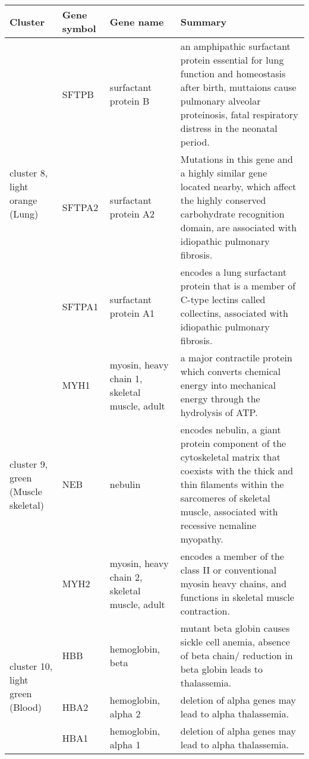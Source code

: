 \newpage
\begin{table}
\begin{center}
\begin{tabular}{|p{0.7in} |p{0.5in}|p{1.4in}|p{3.6in}|}
\hline
Cluster & Gene symbol & Gene name  & Summary \\
\hline
\multirow{3}{4em}{\small{cluster 8, light orange (Lung)}} & \small{SFTPB} & \footnotesize{surfactant protein B} & \scriptsize {an amphipathic surfactant protein essential for lung function and homeostasis after birth, muttaions cause pulmonary alveolar proteinosis, fatal respiratory distress in the neonatal period.} \\
 					    & \small{SFTPA2} & \footnotesize{surfactant protein A2} & \scriptsize{Mutations in this gene and a highly similar gene located nearby, which affect the highly conserved carbohydrate recognition domain, are associated with idiopathic pulmonary fibrosis.} \\
					    & \small{SFTPA1} & \footnotesize{surfactant protein A1} &  \scriptsize{encodes a lung surfactant protein that is a member of C-type lectins called collectins, associated with idiopathic pulmonary fibrosis.} \\
\hline				   
 \multirow{3}{4em}{\small{cluster 9, green (Muscle skeletal)}} & \small{MYH1} & \footnotesize{myosin, heavy chain 1, skeletal muscle, adult }& \scriptsize{a major contractile protein which converts chemical energy into mechanical energy through the hydrolysis of ATP.} \\
 					    & \small{NEB} & \footnotesize{nebulin} & \scriptsize{encodes nebulin, a giant protein component of the cytoskeletal matrix that coexists with the thick and thin filaments within the sarcomeres of skeletal muscle, associated with recessive nemaline myopathy.} \\
					    & \small{MYH2} & \footnotesize{myosin, heavy chain 2, skeletal muscle, adult} & \scriptsize{encodes a member of the class II or conventional myosin heavy chains, and functions in skeletal muscle contraction.} \\
\hline					    
 \multirow{3}{4em}{\small{cluster 10, light green (Blood)}} & \small{HBB} & \footnotesize{hemoglobin, beta} & \scriptsize{mutant beta globin causes sickle cell anemia, absence of beta chain/ reduction in beta globin leads to thalassemia.}\\
 					      & \small{HBA2} & \footnotesize{hemoglobin, alpha 2} & \scriptsize{deletion of alpha genes may lead to alpha thalassemia.}  \\
					      & \small{HBA1} & \footnotesize{hemoglobin, alpha 1} & \scriptsize{deletion of alpha genes may lead to alpha thalassemia.}  \\
\hline				      


\end{tabular}
\end{center}
\end{table}
